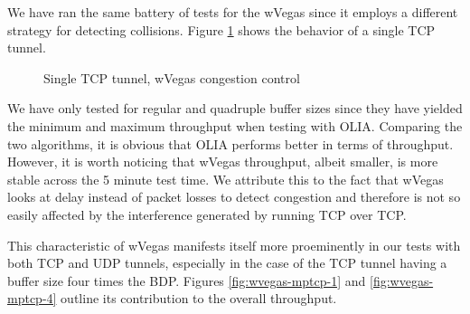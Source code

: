 We have ran the same battery of tests for the wVegas since it employs a
different strategy for detecting collisions. Figure \ref{fig:wvegas-tcp} shows
the behavior of a single TCP tunnel. 

\begin{figure}[H]
  \centering
  \caption{Single TCP tunnel, wVegas congestion control}
  \label{fig:wvegas-tcp}
\end{figure}

We have only tested for regular and quadruple buffer sizes since they have
yielded the minimum and maximum throughput when testing with OLIA. Comparing
the two algorithms, it is obvious that OLIA performs better in terms of
throughput. However, it is worth noticing that wVegas throughput, albeit
smaller, is more stable across the 5 minute test time. We attribute this to
the fact that wVegas looks at delay instead of packet losses to detect
congestion and therefore is not so easily affected by the interference
generated by running TCP over TCP.

This characteristic of wVegas manifests itself more proeminently in our tests
with both TCP and UDP tunnels, especially in the case of the TCP tunnel having
a buffer size four times the BDP. Figures \ref{fig:wvegas-mptcp-1}
and \ref{fig:wvegas-mptcp-4} outline its contribution to the overall
throughput.

